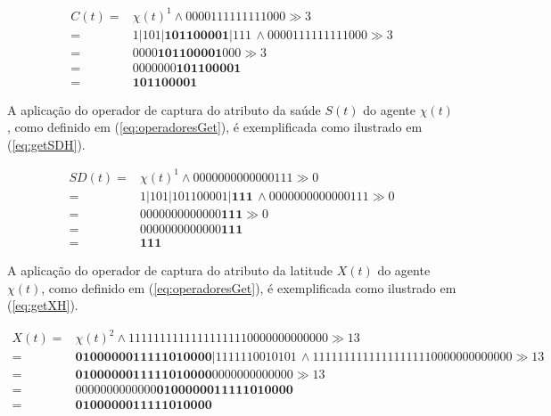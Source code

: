 \begin{equation}
 \begin{split}
 C(t) = & \chi(t)^1 \wedge 0000111111111000 \gg 3 \\
      = & 1 | 1 0 1 | \boldsymbol{1 0 1 1 0 0 0 0 1} | 1 1 1 \, \wedge 0000111111111000 \gg 3 \\
      = & 0 0 0 0 \boldsymbol{1 0 1 1 0 0 0 0 1} 0 0 0 \gg 3 \\
      = & 0 0 0 0 0 0 0 \boldsymbol{1 0 1 1 0 0 0 0 1} \\
      = & \boldsymbol{1 0 1 1 0 0 0 0 1}
 \label{eq:getCH}
 \end{split}
\end{equation}

A aplicação do operador de captura do atributo da saúde $S(t)$ do agente $\chi(t)$, como definido em (\ref{eq:operadoresGet}), é exemplificada como ilustrado em (\ref{eq:getSDH}).

\begin{equation}
 \begin{split}
 SD(t) = & \chi(t)^1 \wedge 0000000000000111 \gg 0 \\
       = & 1 | 1 0 1 | 1 0 1 1 0 0 0 0 1 | \boldsymbol{1 1 1} \, \wedge 0000000000000111 \gg 0 \\
       = & 0 0 0 0 0 0 0 0 0 0 0 0 0 \boldsymbol{1 1 1} \gg 0 \\
       = & 0 0 0 0 0 0 0 0 0 0 0 0 0 \boldsymbol{1 1 1} \\
       = & \boldsymbol{1 1 1}
 \label{eq:getSDH}
 \end{split}
\end{equation}

A aplicação do operador de captura do atributo da latitude $X(t)$ do agente $\chi(t)$, como definido em (\ref{eq:operadoresGet}), é exemplificada como ilustrado em (\ref{eq:getXH}).

\begin{equation}
 \begin{split}
 X(t) = & \chi(t)^2 \wedge 11111111111111111110000000000000 \gg 13 \\
      = & \boldsymbol{0 1 0 0 0 0 0 0 1 1 1 1 1 0 1 0 0 0 0} | 1 1 1 1 1 1 0 0 1 0 1 0 1 \, \wedge 11111111111111111110000000000000 \gg 13 \\
      = & \boldsymbol{0 1 0 0 0 0 0 0 1 1 1 1 1 0 1 0 0 0 0} 0 0 0 0 0 0 0 0 0 0 0 0 0 \gg 13 \\
      = & 0 0 0 0 0 0 0 0 0 0 0 0 0 \boldsymbol{0 1 0 0 0 0 0 0 1 1 1 1 1 0 1 0 0 0 0} \\
      = & \boldsymbol{0 1 0 0 0 0 0 0 1 1 1 1 1 0 1 0 0 0 0}
 \label{eq:getXH}
 \end{split}
\end{equation}

